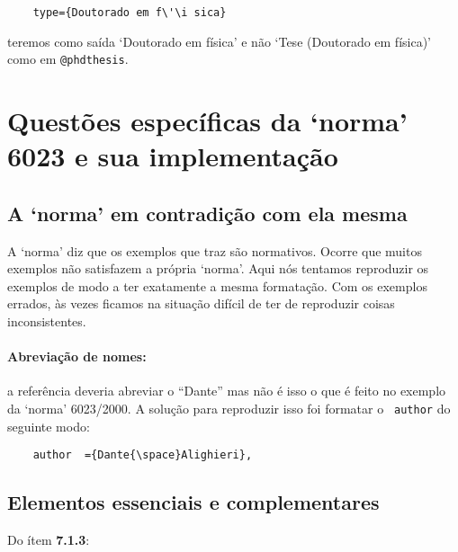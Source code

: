 \documentclass[a4paper]{ltxdoc}
\begin{document}
\begin{verbatim}
    type={Doutorado em f\'\i sica}
\end{verbatim}

teremos como saída `Doutorado em física' e não `Tese (Doutorado em física)' como
em {\tt @phdthesis}.




\appendix

\section{Questões específicas da `norma' 6023 e sua implementação}

\subsection{A `norma' em contradição com ela mesma}

A `norma' diz que os exemplos que traz são normativos. Ocorre que muitos
exemplos não satisfazem a própria `norma'. Aqui nós tentamos reproduzir os
exemplos de modo a ter exatamente a mesma formatação. Com os exemplos errados,
às vezes ficamos na situação difícil de ter de reproduzir coisas inconsistentes.

\paragraph{Abreviação de nomes:} a referência  deveria
abreviar o ``Dante'' mas não é isso o que é feito no exemplo da `norma'
6023/2000\cite{NBR6023:2000}. A solução para reproduzir isso foi formatar o {\tt
author} do seguinte modo:

\begin{verbatim}
    author  ={Dante{\space}Alighieri},
\end{verbatim}

\subsection{Elementos essenciais e complementares}

Do ítem {\bf 7.1.3}\cite{NBR6023:2000}:
\end{document}
